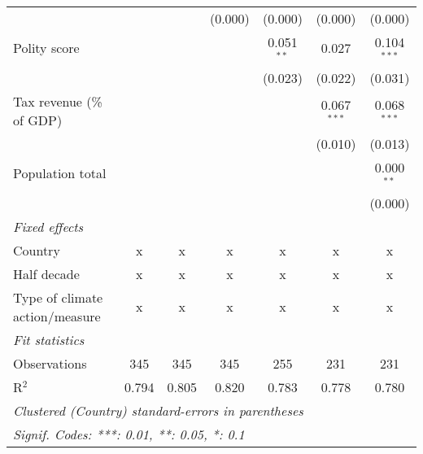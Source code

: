 \begin{tabular}{lcccccc}
                                                                            &         &                & (0.000)        & (0.000)        & (0.000)        & (0.000)\\   
   Polity score                                                             &         &                &                & 0.051$^{**}$   & 0.027          & 0.104$^{***}$\\   
                                                                            &         &                &                & (0.023)        & (0.022)        & (0.031)\\   
   Tax revenue (\% of GDP)                                                  &         &                &                &                & 0.067$^{***}$  & 0.068$^{***}$\\   
                                                                            &         &                &                &                & (0.010)        & (0.013)\\   
   Population total                                                         &         &                &                &                &                & 0.000$^{**}$\\   
                                                                            &         &                &                &                &                & (0.000)\\   
   \emph{Fixed effects}\\
   Country                                                                  & x       & x              & x              & x              & x              & x\\  
   Half decade                                                              & x       & x              & x              & x              & x              & x\\  
   Type of climate action/measure                                           & x       & x              & x              & x              & x              & x\\  
   \midrule \emph{Fit statistics}\\
   Observations                                                             & 345     & 345            & 345            & 255            & 231            & 231\\  
   R$^2$                                                                    & 0.794   & 0.805          & 0.820          & 0.783          & 0.778          & 0.780\\  
   \midrule
   \multicolumn{7}{l}{\emph{Clustered (Country) standard-errors in parentheses}}\\
   \multicolumn{7}{l}{\emph{Signif. Codes: ***: 0.01, **: 0.05, *: 0.1}}\\
\end{tabular}
\par\endgroup


